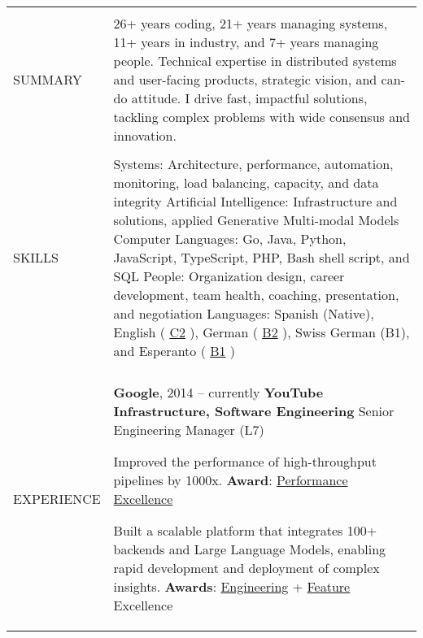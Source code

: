 \documentclass[letterpaper,10pt,oneside]{article}
\newcommand{\DatestampY}[1]{#1}
\newcommand{\itemspacing}{\vspace{0.12cm}}
\newcommand{\sref}[2]{%
    \href{https://0/local/attachments/#1}{\textcolor{hiddenblue}{#2}}%
}
\newenvironment{body}
{\par\par
\begin{longtable}{p{0.145\textwidth}p{0.81\textwidth}}}
{\par\end{longtable}\par}
\renewcommand{\section}[3]{\\[-0.2cm]\pdfbookmark[2]{#2}{#3}\\%
\raggedleft  %
{\fontsize{9.5pt}{9.5pt}\selectfont\bfseries\raggedright%
\MakeUppercase{#1}}&}
\begin{document}
\begin{body}


\section{Summary}{Summary}{PDF:Summary}

26+ years coding, 21+ years managing systems, 11+ years in industry, and 7+ years managing people.\newline
Technical expertise in distributed systems and user-facing products, strategic vision, and can-do attitude.\newline
I drive fast, impactful solutions, tackling complex problems with wide consensus and innovation.


\section{Skills}{Skills}{PDF:Skills}
Systems: Architecture, performance, automation, monitoring, load balancing, capacity, and data integrity\newline
Artificial Intelligence: Infrastructure and solutions, applied Generative Multi-modal Models\newline
Computer Languages: Go, Java, Python, JavaScript, TypeScript, PHP, Bash shell script, and SQL\newline
People: Organization design, career development, team health, coaching, presentation, and negotiation\newline
Languages: Spanish (Native), English (\sref{Diploma-ESOLCPE.pdf}{C2}), German (\sref{Diploma-GoetheDeutsch-B2.pdf}{B2}), Swiss German (B1), and Esperanto (\sref{Diploma-EAB-Esperanto-Meznivela.pdf}{B1})


\section{Experience}{Experience}{PDF:Experience}

\textbf{Google}, \DatestampY{2014} -- currently \vspace{0.06cm} \newline
\phantom{g}\textbf{YouTube Infrastructure, Software Engineering} \textemdash{ }Senior Engineering Manager (L7)
\begin{comp}
\item Improved the performance of high-throughput pipelines by 1000x. \textbf{Award}: \sref{Google-Award-PerformanceExcellence.pdf}{Performance Excellence}
\item Built a scalable platform that integrates 100+ backends and Large Language Models, enabling rapid development and deployment of complex insights. \textbf{Awards}: \sref{Award-EngineeringExcellenceImpact.pdf}{Engineering} + \sref{Google-Award-FeatureExcellence.pdf}{Feature} Excellence
\end{comp}
\itemspacing


\end{body}
\end{document}
